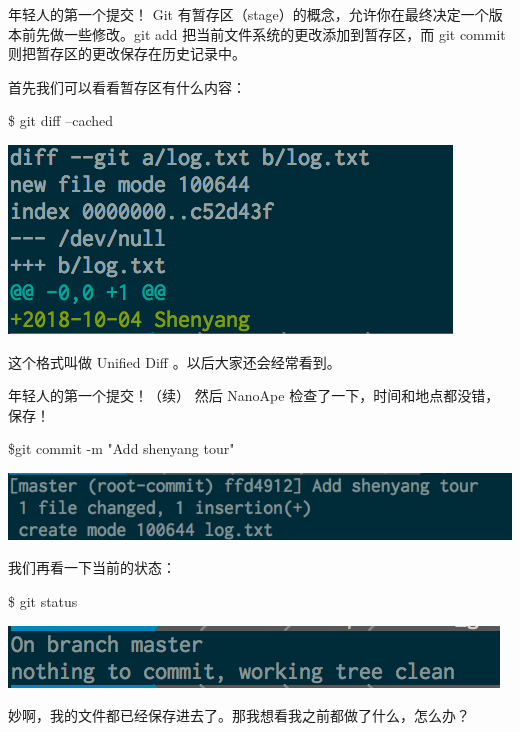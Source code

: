 \documentclass{beamer}
\begin{document}
\begin{frame}{年轻人的第一个提交！}
    Git 有暂存区（stage）的概念，允许你在最终决定一个版本前先做一些修改。git add 把当前文件系统的更改添加到暂存区，而 git commit 则把暂存区的更改保存在历史记录中。

    首先我们可以看看暂存区有什么内容：

    \$ git diff --cached
    
    \includegraphics[width=\linewidth]{2018-10-25-09-49-00.png}

    这个格式叫做 Unified Diff 。以后大家还会经常看到。
\end{frame}

\begin{frame}{年轻人的第一个提交！（续）}
    然后 NanoApe 检查了一下，时间和地点都没错，保存！

    \$git commit -m "Add shenyang tour"

    \includegraphics[width=\linewidth]{2018-10-25-09-55-12.png}

    我们再看一下当前的状态：

    \$ git status

    \includegraphics[width=\linewidth]{2018-10-25-09-55-36.png}

    妙啊，我的文件都已经保存进去了。那我想看我之前都做了什么，怎么办？
\end{frame}
\end{document}
